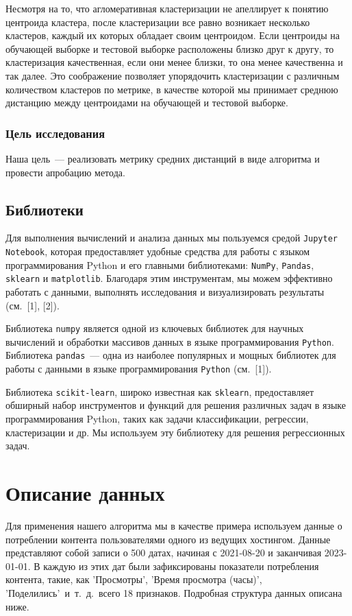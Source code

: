 \documentclass[a4paper,12pt]{article}
\begin{document}
Несмотря на то, что агломеративная кластеризации не апеллирует к понятию центроида кластера, после кластеризации все равно возникает несколько кластеров, каждый их которых обладает своим центроидом. Если центроиды на обучающей выборке и тестовой выборке расположены близко друг к другу, то кластеризация качественная, если они менее близки, то она менее качественна и так далее. Это соображение позволяет упорядочить кластеризации с различным количеством кластеров по метрике, в качестве которой мы принимает среднюю дистанцию между центроидами на обучающей и тестовой выборке.

\subsubsection{Цель исследования} 

Наша цель — реализовать метрику средних дистанций в виде алгоритма и провести апробацию метода.

\subsection{Библиотеки}
Для выполнения вычислений и анализа данных мы пользуемся средой \texttt{Jupyter Notebook}, которая предоставляет удобные средства для работы с языком программирования Python и его главными библиотеками: \texttt{NumPy}, \texttt{Pandas}, \texttt{sklearn} и \texttt{matplotlib}. Благодаря этим инструментам, мы можем эффективно работать с данными, выполнять исследования и визуализировать результаты (см. [1], [2]). 

Библиотека \texttt{numpy} является одной из ключевых библиотек для научных вычислений и обработки массивов данных в языке программирования \texttt{Python}. Библиотека \texttt{pandas}~--- одна из наиболее популярных и мощных библиотек для работы с данными в языке программирования \texttt{Python} (см. [1]). 

Библиотека \texttt{scikit-learn}, широко известная как \texttt{sklearn}, предоставляет обширный набор инструментов и функций для решения различных задач в языке программирования Python, таких как задачи классификации, регрессии, кластеризации и др. Мы используем эту библиотеку для решения регрессионных задач.

\section{Описание данных}
Для применения нашего алгоритма мы в качестве примера используем данные о потреблении контента пользователями одного из ведущих хостингом. Данные представляют собой записи о 500 датах, начиная с 2021-08-20 и заканчивая 2023-01-01. В каждую из этих дат были зафиксированы показатели потребления контента, такие, как 'Просмотры', 'Время просмотра (часы)', 'Поделились' и т. д. всего 18 признаков. Подробная структура данных описана ниже.
\end{document}
